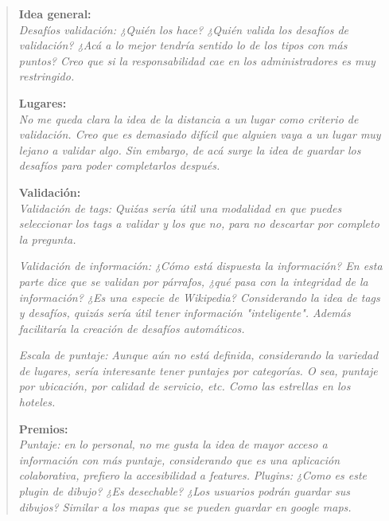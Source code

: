 \documentclass[10pt,letterpaper]{article}
\begin{document}
\begin{quote}
\textbf{Idea general:}\\

\textit{Desafíos validación: ¿Quién los hace? ¿Quién valida los desafíos de validación? ¿Acá a lo mejor tendría sentido lo de los tipos con más puntos? Creo que si la responsabilidad cae en los administradores es muy restringido.\\}

\textbf{Lugares:}\\

\textit{No me queda clara la idea de la distancia a un lugar como criterio de validación. Creo que es demasiado difícil que alguien vaya a un lugar muy lejano a validar algo. Sin embargo, de acá surge la idea de guardar los desafíos para poder completarlos después.\\}

\textbf{Validación:}\\

\textsl{Validación de tags:} \textit{Quiźas sería útil una modalidad en que puedes seleccionar los tags a validar y los que no, para no descartar por completo la pregunta.\\}

\textsl{Validación de información:}\textit{ ¿Cómo está dispuesta la información? En esta parte dice que se validan por párrafos, ¿qué pasa con la integridad de la información? ¿Es una especie de Wikipedia? Considerando la idea de tags y desafíos, quizás sería útil tener información "inteligente". Además facilitaría la creación de desafíos automáticos.\\}

\textsl{Escala de puntaje:} \textit{Aunque aún no está definida, considerando la variedad de lugares, sería interesante tener puntajes por categorías. O sea, puntaje por ubicación, por calidad de servicio, etc. Como las estrellas en los hoteles.\\}

\textbf{Premios:}\\

\textsl{Puntaje:} \textit{en lo personal, no me gusta la idea de mayor acceso a información con más puntaje, considerando que es una aplicación colaborativa, prefiero la accesibilidad a features.}
\textsl{Plugins:} \textit{¿Como es este plugin de dibujo? ¿Es desechable? ¿Los usuarios podrán guardar sus dibujos? Similar a los mapas que se pueden guardar en google maps.}
\end{quote}
\end{document}
